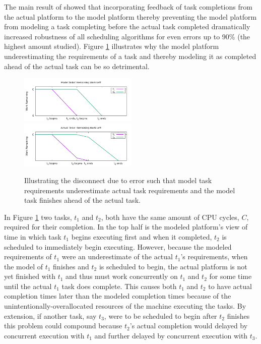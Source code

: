 \documentclass[10pt]{csce}
\begin{document}
The main result of \cite{pdpta18} showed that incorporating feedback of
task completions from the actual platform to the model platform thereby
preventing the model platform from modeling a task completing before the
actual task completed dramatically increased robustness of all scheduling
algorithms for even errors up to 90\% (the highest amount studied).  Figure
\ref{fig:underestimating} illustrates why the model platform underestimating
the requirements of a task and thereby modeling it as completed ahead of the
actual task can be so detrimental.

\begin{figure}
	\begin{center}
		\includegraphics[width=0.5\textwidth]{figures/UnderestimatedErrorEffect_ModelTaskWork.pdf}
		\includegraphics[width=0.5\textwidth]{figures/UnderestimatedErrorEffect_ActualTaskWork.pdf}
	\end{center}
	\caption{Illustrating the disconnect due to error such that model task
		requirements underestimate actual task requirements and the model
		task finishes ahead of the actual task.}
	\label{fig:underestimating}
\end{figure}

In Figure \ref{fig:underestimating} two tasks, $t_1$ and $t_2$, both have
the same amount of CPU cycles, $C$, required for their completion.  In the
top half is the modeled platform's view of time in which task $t_1$ begins
executing first and when it completed, $t_2$ is scheduled to immediately
begin executing.  However, because the modeled requirements of $t_1$ were
an underestimate of the actual $t_1$'s requirements, when the model of
$t_1$ finishes and $t_2$ is scheduled to begin, the actual platform is not
yet finished with $t_1$ and thus must work concurrently on $t_1$ and $t_2$
for some time until the actual $t_1$ task does complete.  This causes both
$t_1$ and $t_2$ to have actual completion times later than the modeled
completion times because of the unintentionally-overallocated resources of
the machine executing the tasks.  By extension, if another task, say $t_3$,
were to be scheduled to begin after $t_2$ finishes this problem could compound
because $t_2$'s actual completion would delayed by concurrent execution with
$t_1$ and further delayed by concurrent execution with $t_3$.
\end{document}
